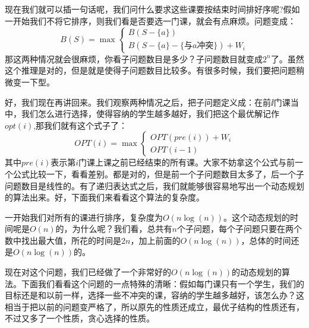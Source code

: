 	
	现在我们就可以插一句话呢，我们问什么要求这些课要按结束时间排好序呢?假如一开始我们不将它排序，则我们看是否要选一门课，就会有点麻烦。问题变成：
	\[ B(S)=\max\begin{cases}
	B(S-\{a\})\nonumber\\
	B(S-\{a\}-\{\mbox{与}a\mbox{冲突}\})+W_i \nonumber
	\end{cases} \]
	那这两种情况就会很麻烦，你看子问题数目是多少？子问题数目就变成$2^n$了。虽然这个推理是对的，但是就是使得子问题数目比较多。有很多时候，我们要把问题稍微变一下型。
	
	好，我们现在再讲回来。我们观察两种情况之后，把子问题定义成：在前ⅈ门课当中，我们怎么进行选择，使得容纳的学生越多越好，我们把这个最优解记作$opt(i)$,那我们就有这个式子了：
	\[OPT(i) = \max \begin{cases}
	OPT( pre(i) ) + W_i \nonumber\\
	OPT( i-1) \nonumber 
	\end{cases}\]
	其中$pre(i)$表示第$i$门课上课之前已经结束的所有课。大家不妨拿这个公式与前一个公式比较一下，看看差别。都是对的，但是前一个子问题数目太多了，后一个子问题数目是线性的。有了递归表达式之后，我们就能够很容易地写出一个动态规划的算法出来。好，下面我们来看看这个算法的复杂度。
	
	一开始我们对所有的课进行排序，复杂度为$O(n\log(n))$。这个动态规划的时间呢是$O(n)$的，为什么呢？我们看，总共有$n$个子问题，每个子问题只要在两个数中找出最大值，所花的时间是$2n$，加上前面的$O(n\log(n))$，总体的时间还是$O(n\log(n))$的。
	
	现在对这个问题，我们已经做了一个非常好的$O(n\log(n))$的动态规划的算法。下面我们看看这个问题的一点特殊的清晰：假如每门课只有一个学生，我们的目标还是和以前一样，选择一些不冲突的课，容纳的学生越多越好，该怎么办？这相当于把以前的问题变严格了，所以原先的性质还成立，最优子结构的性质还有，不过又多了一个性质，贪心选择的性质。
	
